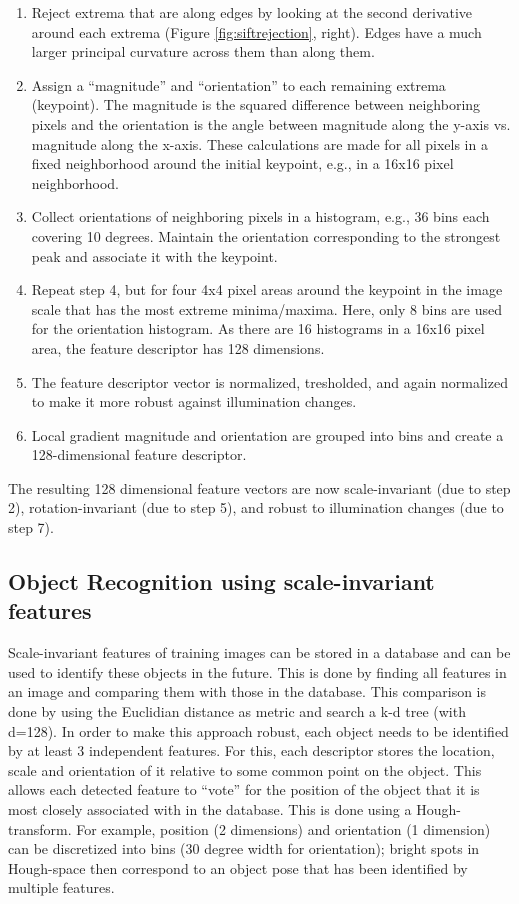 \begin{enumerate}
\item Reject extrema that are along edges by looking at the second derivative around each extrema (Figure \ref{fig:siftrejection}, right). Edges have a much larger principal curvature across them than along them.
\item Assign a ``magnitude'' and ``orientation'' to each remaining extrema (keypoint). The magnitude is the squared difference between neighboring pixels and the orientation is the angle between magnitude along the y-axis vs. magnitude along the x-axis. These calculations are made for all pixels in a fixed neighborhood around the initial keypoint, e.g., in a 16x16 pixel neighborhood.
\item Collect orientations of neighboring pixels in a histogram, e.g., 36 bins each covering 10 degrees. Maintain the orientation corresponding to the strongest peak and associate it with the keypoint.
\item Repeat step 4, but for four 4x4 pixel areas around the keypoint in the image scale that has the most extreme minima/maxima. Here, only 8 bins are used for the orientation histogram. As there are 16 histograms in a 16x16 pixel area, the feature descriptor has 128 dimensions.
\item The feature descriptor vector is normalized, tresholded, and again normalized to make it more robust against illumination changes.
\item Local gradient magnitude and orientation are grouped into bins and create a 128-dimensional feature descriptor.
\end{enumerate}

The resulting 128 dimensional feature vectors are now scale-invariant (due to step 2), rotation-invariant (due to step 5), and robust to illumination changes (due to step 7).

\subsection{Object Recognition using scale-invariant features}
Scale-invariant features of training images can be stored in a database and can be used to identify these objects in the future. This is done by finding all features in an image and comparing them with those in the database. This comparison is done by using the Euclidian distance as metric and search a k-d tree (with d=128). In order to make this approach robust, each object needs to be identified by at least 3 independent features. For this, each descriptor stores the location, scale and orientation of it relative to some common point on the object. This allows each detected feature to ``vote'' for the position of the object that it is most closely associated with in the database.  This is done using a Hough-transform. For example, position (2 dimensions) and orientation (1 dimension) can be discretized into bins (30 degree width for orientation); bright spots in Hough-space then correspond to an object pose that has been identified by multiple features.

